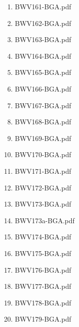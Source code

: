 \documentclass[11pt]{article}
\begin{document}
\begin{enumerate}
\begin{enumerate}
\begin{enumerate}
\item BWV161-BGA.pdf
\label{sec-1-1-1-1-44-6-7-1-182}

\item BWV162-BGA.pdf
\label{sec-1-1-1-1-44-6-7-1-183}

\item BWV163-BGA.pdf
\label{sec-1-1-1-1-44-6-7-1-184}

\item BWV164-BGA.pdf
\label{sec-1-1-1-1-44-6-7-1-185}

\item BWV165-BGA.pdf
\label{sec-1-1-1-1-44-6-7-1-186}

\item BWV166-BGA.pdf
\label{sec-1-1-1-1-44-6-7-1-187}

\item BWV167-BGA.pdf
\label{sec-1-1-1-1-44-6-7-1-188}

\item BWV168-BGA.pdf
\label{sec-1-1-1-1-44-6-7-1-189}

\item BWV169-BGA.pdf
\label{sec-1-1-1-1-44-6-7-1-190}

\item BWV170-BGA.pdf
\label{sec-1-1-1-1-44-6-7-1-191}

\item BWV171-BGA.pdf
\label{sec-1-1-1-1-44-6-7-1-192}

\item BWV172-BGA.pdf
\label{sec-1-1-1-1-44-6-7-1-193}

\item BWV173-BGA.pdf
\label{sec-1-1-1-1-44-6-7-1-194}

\item BWV173a-BGA.pdf
\label{sec-1-1-1-1-44-6-7-1-195}

\item BWV174-BGA.pdf
\label{sec-1-1-1-1-44-6-7-1-196}

\item BWV175-BGA.pdf
\label{sec-1-1-1-1-44-6-7-1-197}

\item BWV176-BGA.pdf
\label{sec-1-1-1-1-44-6-7-1-198}

\item BWV177-BGA.pdf
\label{sec-1-1-1-1-44-6-7-1-199}

\item BWV178-BGA.pdf
\label{sec-1-1-1-1-44-6-7-1-200}

\item BWV179-BGA.pdf
\label{sec-1-1-1-1-44-6-7-1-201}


\end{enumerate}
\end{enumerate}
\end{enumerate}
\end{document}
